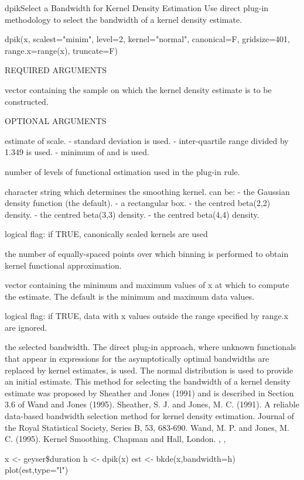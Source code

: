 \begin{Helpfile}{dpik}{Select a Bandwidth for Kernel Density Estimation}
Use direct plug-in methodology to select the bandwidth
of a kernel density estimate.
\begin{Example}
dpik(x, scalest="minim", level=2, kernel="normal",   
     canonical=F, gridsize=401, range.x=range(x), 
     truncate=F)
\end{Example}
\begin{Argument}{REQUIRED ARGUMENTS}
\item[\Co{x:}]
vector containing the sample on which the
kernel density estimate is to be constructed.
\end{Argument}
\begin{Argument}{OPTIONAL ARGUMENTS}
\item[\Co{scalest:}]
estimate of scale.
  - standard deviation is used.
  - inter-quartile range divided by 1.349 is used.
  - minimum of  and  is used.
\item[\Co{level:}]
number of levels of functional estimation used in the
plug-in rule.
\item[\Co{kernel:}]
character string which determines the smoothing kernel.
 can be:
 - the Gaussian density function (the default).
 - a rectangular box.
 - the centred beta(2,2) density.
 - the centred beta(3,3) density.
 - the centred beta(4,4) density.
\item[\Co{canonical:}]
logical flag: if TRUE, canonically scaled kernels are used
\item[\Co{gridsize:}]
the number of equally-spaced points over which binning is 
performed to obtain kernel functional approximation. 
\item[\Co{range.x:}]
vector containing the minimum and maximum values of x
at which to compute the estimate.
The default is the minimum and maximum data values.
\item[\Co{truncate:}]
logical flag: if TRUE, data with x values outside the
range specified by range.x are ignored.
\end{Argument}
the selected bandwidth.
The direct plug-in approach, where unknown functionals
that appear in expressions for the asymptotically
optimal bandwidths
are replaced by kernel estimates, is used.
The normal distribution is used to provide an
initial estimate.
This method for selecting the bandwidth of a kernel
density estimate was proposed by Sheather and
Jones (1991)
and is
described in Section 3.6 of Wand and Jones (1995). 
Sheather, S. J. and Jones, M. C. (1991).
A reliable data-based bandwidth selection method for
kernel density estimation.
Journal of the Royal Statistical Society, Series B, 53, 683-690.
Wand, M. P. and Jones, M. C. (1995).
Kernel Smoothing.
Chapman and Hall, London.
, , 
\need 15pt
\vspace{-16pt}
\begin{Example}
x <- geyser\$duration
h <- dpik(x)
est <- bkde(x,bandwidth=h)
plot(est,type="l")
\end{Example}
\end{Helpfile}
